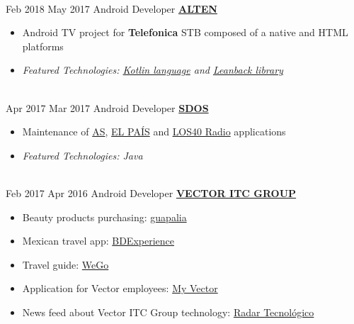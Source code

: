 \documentclass[letterpaper]{twentysecondcv} %
\begin{document}
\begin{twenty}
{\begin{itemize}
        \end{itemize}}
        \\
\twentyitem
    	{Feb 2018}
		{May 2017}
        {Android Developer}
        {\href{http://www.alten.es/}{\textbf{ALTEN}}}
        {}
        {\begin{itemize}
        \item Android TV project for \textbf{Telefonica} STB composed of a native and HTML platforms
        \item \textit{Featured Technologies: \href{https://developer.android.com/kotlin/index.html}{Kotlin language} and \href{https://developer.android.com/tv/index.html}{Leanback library}}
        \end{itemize}}
        \\
	\twentyitem
    	{Apr 2017}
		{Mar 2017}
        {Android Developer}
        {\href{http://sdos.es/}{\textbf{SDOS}}}
        {}
        {
        {\begin{itemize}
        \item Maintenance of \href{https://play.google.com/store/apps/details?id=es.mmip.prisacom.as}{AS}, \href{https://play.google.com/store/apps/details?id=com.elpais.elpais}{EL PAÍS} and \href{https://play.google.com/store/apps/details?id=com.prisaradio.replicapp.loscuarenta}{LOS40 Radio} applications
        \item \textit{Featured Technologies: Java} 
    \end{itemize}}
        }
    \\   
    \twentyitem
   		{Feb 2017}
		{Apr 2016}
        {Android Developer}
        {\href{http://www.vectoritcgroup.com/es/home/global}{\textbf{VECTOR ITC GROUP}}}
        {}
        {
        {\begin{itemize}
        \item Beauty products purchasing: \href{https://play.google.com/store/apps/details?id=com.guapalia&hl=es}{guapalia}
        \item Mexican travel app: \href{https://play.google.com/store/apps/details?id=com.bdtravel.re_appbdtravelandroid&hl=es}{BDExperience}
        \item Travel guide: \href{https://play.google.com/store/apps/details?id=com.wego.bcn&hl=es}{WeGo}
        \item Application for Vector employees:
		\href{https://play.google.com/store/apps/details?id=com.vectormobile.myvector&hl=es}{My Vector}
		\item News feed about Vector ITC Group technology:
		\href{https://play.google.com/store/apps/details?id=com.vectormobile.trends&hl=es}{Radar Tecnológico}

\end{itemize}}}
\end{twenty}
\end{document}
